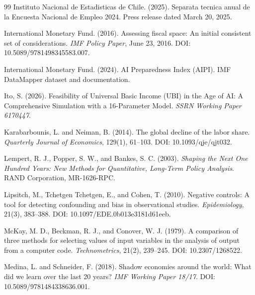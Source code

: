\documentclass[11pt,a4paper]{article}
\begin{document}
\begin{thebibliography}{99}
Instituto Nacional de Estadisticas de Chile. (2025).
\newblock Separata tecnica anual de la Encuesta Nacional de Empleo 2024.
\newblock Press release dated March 20, 2025.

International Monetary Fund. (2016).
\newblock Assessing fiscal space: An initial consistent set of considerations.
\newblock \emph{IMF Policy Paper}, June 23, 2016. DOI: 10.5089/9781498345583.007.

International Monetary Fund. (2024).
\newblock AI Preparedness Index (AIPI).
\newblock IMF DataMapper dataset and documentation.

Ito, S. (2026).
\newblock Feasibility of Universal Basic Income (UBI) in the Age of AI: A Comprehensive Simulation with a 16-Parameter Model.
\newblock \emph{SSRN Working Paper 6170447}.

Karabarbounis, L. and Neiman, B. (2014).
\newblock The global decline of the labor share.
\newblock \emph{Quarterly Journal of Economics}, 129(1), 61--103. DOI: 10.1093/qje/qjt032.

Lempert, R. J., Popper, S. W., and Bankes, S. C. (2003).
\newblock \emph{Shaping the Next One Hundred Years: New Methods for Quantitative, Long-Term Policy Analysis}.
\newblock RAND Corporation, MR-1626-RPC.



Lipsitch, M., Tchetgen Tchetgen, E., and Cohen, T. (2010).
\newblock Negative controls: A tool for detecting confounding and bias in observational studies.
\newblock \emph{Epidemiology}, 21(3), 383--388. DOI: 10.1097/EDE.0b013e3181d61eeb.

McKay, M. D., Beckman, R. J., and Conover, W. J. (1979).
\newblock A comparison of three methods for selecting values of input variables in the analysis of output from a computer code.
\newblock \emph{Technometrics}, 21(2), 239--245. DOI: 10.2307/1268522.

Medina, L. and Schneider, F. (2018).
\newblock Shadow economies around the world: What did we learn over the last 20 years?
\newblock \emph{IMF Working Paper 18/17}. DOI: 10.5089/9781484338636.001.


\end{thebibliography}
\end{document}
